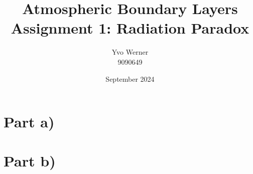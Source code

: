 \documentclass{article}
\title{Atmospheric Boundary Layers \\ \vspace{1em} \large Assignment 1: Radiation Paradox \normalsize}
\author{Yvo Werner\\ 9090649 }
\date{September 2024}
\begin{document}
\maketitle

\section*{Part a)}



\section*{Part b)}







% 
\end{document}
